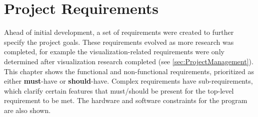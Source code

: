 
\newcommand{\must}[0]{\textbf{must}}
\newcommand{\should}[0]{\textbf{should}}
\newcommand{\shouldnt}[0]{\textbf{should not}}


\chapter{Project Requirements}
\label{sec:Requirements}
Ahead of initial development, a set of requirements were created to further specify the project goals.
These requirements evolved as more research was completed, for example the visualization-related requirements were only determined after visualization research completed (see \cref{sec:ProjectManagement}).
This chapter shows the functional and non-functional requirements, prioritized as either \must{}-have or \should{}-have.
Complex requirements have sub-requirements, which clarify certain features that must/should be present for the top-level requirement to be met.
The hardware and software constraints for the program are also shown.







